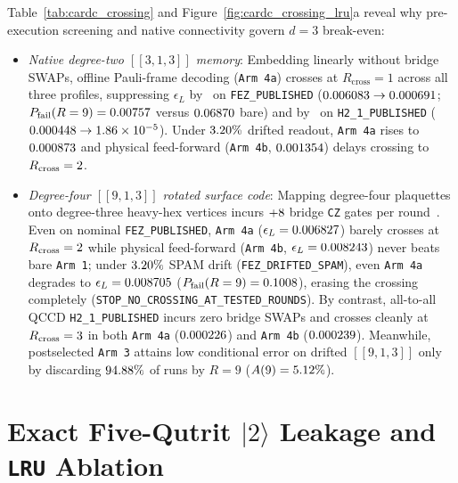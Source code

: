 \documentclass[aps,prx,twocolumn,superscriptaddress,nofootinbib]{revtex4-2}
\begin{document}
Table~\ref{tab:cardc_crossing} and Figure~\ref{fig:cardc_crossing_lru}a reveal why pre-execution screening and native connectivity govern $d = 3$ break-even:
\begin{itemize}
  \item \emph{Native degree-two $[[3,1,3]]$ memory}: Embedding linearly without bridge SWAPs, offline Pauli-frame decoding (\texttt{Arm 4a}) crosses at $R_{\mathrm{cross}} = 1$ across all three profiles, suppressing $\epsilon_L$ by \ecqFezRepSuppX\ on \texttt{FEZ\_PUBLISHED} ($0.006083 \to 0.000691$; $P_{\mathrm{fail}}(R=9) = 0.00757$ versus $0.06870$ bare) and by \ecqHtwoRepSuppX\ on \texttt{H2\_1\_PUBLISHED} ($0.000448 \to 1.86 \times 10^{-5}$). Under $3.20\%$ drifted readout, \texttt{Arm 4a} rises to $0.000873$ and physical feed-forward (\texttt{Arm 4b}, $0.001354$) delays crossing to $R_{\mathrm{cross}} = 2$.
  \item \emph{Degree-four $[[9,1,3]]$ rotated surface code}: Mapping degree-four plaquettes onto degree-three heavy-hex vertices incurs $+8$ bridge \texttt{CZ} gates per round~\cite{ChamberlandHeavyHex2020}. Even on nominal \texttt{FEZ\_PUBLISHED}, \texttt{Arm 4a} ($\epsilon_L = 0.006827$) barely crosses at $R_{\mathrm{cross}} = 2$ while physical feed-forward (\texttt{Arm 4b}, $\epsilon_L = 0.008243$) never beats bare \texttt{Arm 1}; under $3.20\%$ SPAM drift (\texttt{FEZ\_DRIFTED\_SPAM}), even \texttt{Arm 4a} degrades to $\epsilon_L = 0.008705$ ($P_{\mathrm{fail}}(R=9) = 0.1008$), erasing the crossing completely (\texttt{STOP\_NO\_CROSSING\_AT\_TESTED\_ROUNDS}). By contrast, all-to-all QCCD \texttt{H2\_1\_PUBLISHED} incurs zero bridge SWAPs and crosses cleanly at $R_{\mathrm{cross}} = 3$ in both \texttt{Arm 4a} ($0.000226$) and \texttt{Arm 4b} ($0.000239$). Meanwhile, postselected \texttt{Arm 3} attains low conditional error on drifted $[[9,1,3]]$ only by discarding $94.88\%$ of runs by $R = 9$ ($A(9) = 5.12\%$).
\end{itemize}

\section{Exact Five-Qutrit $|2\rangle$ Leakage and \texttt{LRU} Ablation}
\end{document}
